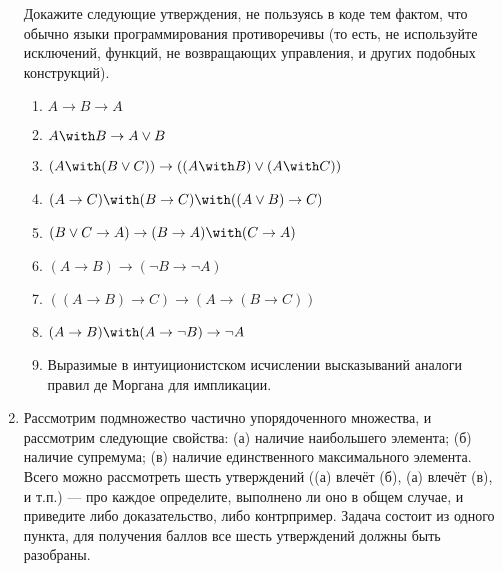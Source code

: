 \documentclass[10pt,a4paper,oneside]{article}
\begin{document}
\begin{enumerate}
Докажите следующие утверждения, не пользуясь в коде тем фактом, что обычно языки программирования
противоречивы (то есть, не используйте исключений, функций, не возвращающих управления, и других подобных конструкций).
\begin{enumerate}
\item $A \rightarrow B \rightarrow A$
\item $A \with B \rightarrow A \vee B$
\item $(A \with (B \vee C)) \rightarrow ((A \with B) \vee (A \with C))$
\item $(A \rightarrow C) \with (B \rightarrow C) \with ((A \vee B) \rightarrow C)$
\item $(B \vee C \rightarrow A) \rightarrow (B \rightarrow A) \with (C \rightarrow A)$
\item $(A \rightarrow B) \rightarrow (\neg B \rightarrow \neg A)$
\item $((A \rightarrow B) \rightarrow C) \rightarrow (A \rightarrow (B \rightarrow C))$
\item $(A \rightarrow B) \with (A \rightarrow \neg B) \rightarrow \neg A$
\item Выразимые в интуиционистском исчислении высказываний аналоги правил де Моргана для импликации.
\end{enumerate}

\item Рассмотрим подмножество частично упорядоченного множества, и рассмотрим следующие свойства:
(а) наличие наибольшего элемента; (б) наличие супремума;
(в) наличие единственного максимального элемента. Всего можно рассмотреть шесть утверждений ((а) влечёт (б), 
(а) влечёт (в), и т.п.) --- про каждое определите, выполнено ли оно в общем случае,
и приведите либо доказательство, либо контрпример. Задача состоит из одного пункта, для получения баллов 
все шесть утверждений должны быть разобраны.


\end{enumerate}
\end{document}

